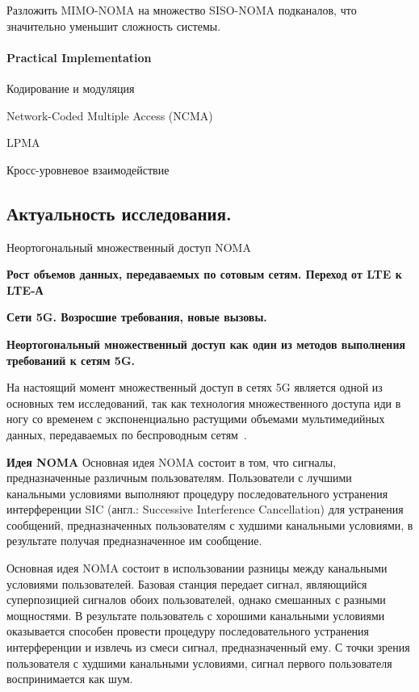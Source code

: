\documentclass{book}
\numberwithin{theorem}{chapter}
\numberwithin{statement}{chapter}
\numberwithin{lemma}{chapter}
\theoremstyle{definition}
\numberwithin{task}{chapter}
\theoremstyle{remark}
\numberwithin{example}{chapter}
\theoremstyle{definition}
\numberwithin{definition}{chapter}
\theoremstyle{remark}
\theoremstyle{remark}
\numberwithin{lyrics}{section}
\begin{document}
	Разложить MIMO-NOMA на множество  SISO-NOMA подканалов, что значительно уменьшит сложность системы.
	
	\paragraph{Practical Implementation}
	
	Кодирование и модуляция
	
	Network-Coded Multiple Access (NCMA)
	
	LPMA 
	
	Кросс-уровневое взаимодействие
	
	
	
	
	\subsection{Актуальность исследования.}
	Неортогональный множественный доступ NOMA 
	
	\textbf{Рост объемов данных, передаваемых по сотовым сетям. Переход от LTE к LTE-А}
	
	\textbf{Сети 5G. Возросшие требования, новые вызовы.}
	
	\textbf{Неортогональный множественный доступ как один из методов выполнения требований к сетям 5G.}
	
	На настоящий момент множественный доступ в сетях 5G является одной из основных тем исследований, 
	так как технология множественного доступа иди в ногу со временем с экспоненциально растущими объемами мультимедийных данных, передаваемых по беспроводным сетям~\cite{li2014network, huawei2013vision}.
	
	\textbf{Идея NOMA}
	Основная идея NOMA состоит в том, что сигналы, предназначенные различным пользователям. Пользователи с лучшими канальными условиями выполняют процедуру последовательного устранения интерференции SIC (англ.: Successive Interference Cancellation) для устранения сообщений, предназначенных пользователям с худшими канальными условиями, в результате получая предназначенное им сообщение.

	Основная идея NOMA состоит в использовании разницы между канальными условиями пользователей. Базовая станция передает сигнал, являющийся суперпозицией сигналов обоих пользователей, однако смешанных с разными мощностями. В результате пользователь с хорошими канальными условиями оказывается способен провести процедуру последовательного устранения интерференции и извлечь из смеси сигнал, предназначенный ему. С точки зрения пользователя с худшими канальными условиями, сигнал первого пользователя воспринимается как шум.
	
\end{document}
